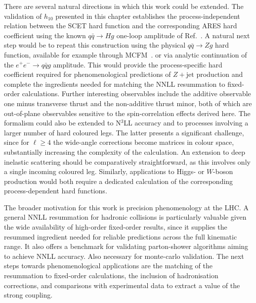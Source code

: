 There are several natural directions in which this work could be
extended. The validation of $h_{10}$ presented in this chapter
establishes the process-independent relation between the SCET hard
function and the corresponding \textsc{ARES} hard coefficient using the
known $q\bar q\to Hg$ one-loop amplitude of
Ref.~\cite{Ravindran:2002dc}. A natural next step would be to repeat this
construction using the physical $q\bar q\to Zg$ hard function, available
for example through \textsc{MCFM}~\cite{Campbell:1999ah,Campbell:2011bn,Campbell:2019dru}.
 or via analytic
continuation of the $e^+e^-\to q\bar q g$ amplitude. This would provide
the process-specific hard coefficient required for phenomenological
predictions of $Z+\mathrm{jet}$ production and complete the ingredients
needed for matching the NNLL resummation to fixed-order calculations.
Further
interesting observables include the additive observable one minus
transverse thrust and the non-additive thrust minor, both of which are
out-of-plane observables sensitive to the spin-correlation effects
derived here. The formalism could also be extended to N$^3$LL accuracy
and to processes involving a larger number of hard coloured legs. The
latter presents a significant challenge, since for
$\ell\geq4$ the wide-angle corrections become matrices in colour space,
substantially increasing the complexity of the calculation. An
extension to deep inelastic scattering should be comparatively
straightforward, as this involves only a single incoming coloured leg. Similarly, applications
to Higgs- or $W$-boson production would both require a dedicated calculation of the 
corresponding process-dependent hard functions.

The broader motivation for this work is precision phenomenology at the
LHC. A general NNLL resummation for hadronic collisions is
particularly valuable given the wide availability of high-order
fixed-order results, since it supplies the resummed ingredient needed
for reliable predictions across the full kinematic range. It also offers a benchmark
for validating parton-shower algorithms aiming to achieve NNLL
accuracy.  Also necessary for monte-carlo validation. 
The next steps towards phenomenological applications are the
matching of the resummation to fixed-order calculations, the inclusion
of hadronisation corrections, and comparisons with experimental data to
extract a value of the strong coupling. 
